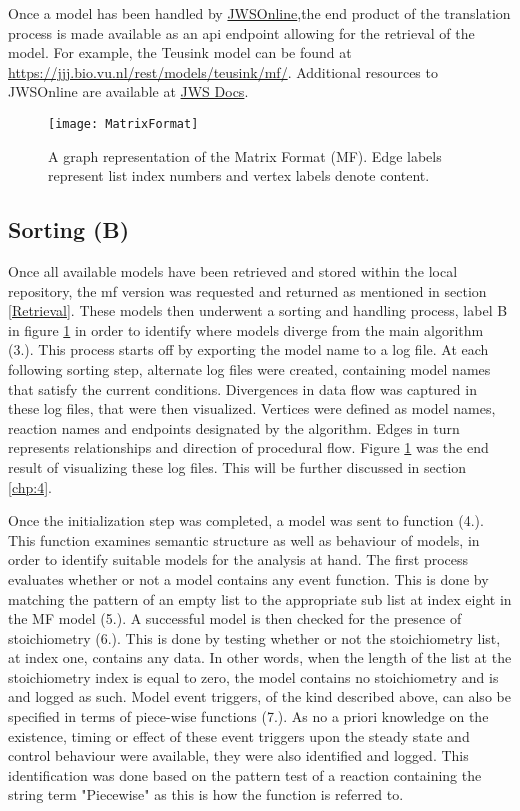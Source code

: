 Once a model has been handled by \href{https://jjj.bio.vu.nl}{JWSOnline},the end product of the translation process is made available as an \gls{api} endpoint allowing for the retrieval of the model. For example, the Teusink model can be found at \href{https://jjj.bio.vu.nl/rest/models/teusink/mf/}{https://jjj.bio.vu.nl/rest/models/teusink/mf/}. Additional resources to JWSOnline are available at \href{http://jws-docs.readthedocs.io/8_rest.html}{JWS Docs}. 

\begin{figure}[p]
\texttt{[image: MatrixFormat]}
\centering
\caption{A graph representation of the Matrix Format (MF). Edge labels represent list index numbers and vertex labels denote content.}
\label{fig:MatrixFormat}
\end{figure}

\subsection{Sorting (B)}\label{Sorting}
Once all available models have been retrieved and stored within the local repository, the mf version was requested and returned as mentioned in section \ref{Retrieval}. These models then underwent a sorting and handling process, label B in figure \ref{fig:MatrixFormat} in order to identify where models diverge from the main algorithm (3.). This process starts off by exporting the model name to a log file. At each following sorting step, alternate log files were created, containing model names that satisfy the current conditions. Divergences in data flow was captured in these log files, that were then visualized. Vertices were defined as model names, reaction names and endpoints designated by the algorithm. Edges in turn represents relationships and direction of procedural flow. Figure \ref{fig:MatrixFormat} was the end result of visualizing these log files. This will be further discussed in section \ref{chp:4}. 

Once the initialization step was completed, a model was sent to function (4.). This function examines semantic structure as well as behaviour of models, in order to identify suitable models for the analysis at hand. The first process evaluates whether or not a model contains any event function. This is done by matching the pattern of an empty list to the appropriate sub list at index eight in the MF model (5.). A successful model is then checked for the presence of stoichiometry (6.). This is done by testing whether or not the stoichiometry list, at index one, contains any data. In other words, when the length of the list at the stoichiometry index is equal to zero, the model contains no stoichiometry and is and logged as such. Model event triggers, of the kind described above, can also be specified in terms of piece-wise functions (7.). As no a priori knowledge on the existence, timing or effect of these event triggers upon the steady state and control behaviour were available, they were also identified and logged. This identification was done based on the pattern test of a reaction containing the string term "Piecewise" as this is how the function is referred to. 


